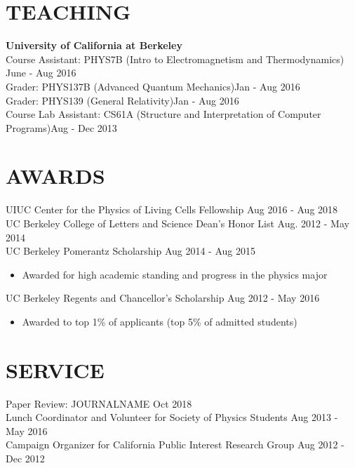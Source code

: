 \documentclass{res}
\newcommand{\rfill}{\hspace*{\fill}}
\begin{document}
\begin{resume}
\section{TEACHING}
   \textbf{University of California at Berkeley}
   \\Course Assistant: PHYS7B (Intro to Electromagnetism and Thermodynamics) \hfill June - Aug 2016
   \\Grader: PHYS137B (Advanced Quantum Mechanics)\hfill Jan - Aug 2016
   \\Grader: PHYS139 (General Relativity)\hfill Jan - Aug 2016
   \\Course Lab Assistant: CS61A (Structure and Interpretation of Computer Programs)\hfill Aug - Dec 2013
\section{AWARDS}
   UIUC Center for the Physics of Living Cells Fellowship \hfill Aug 2016 - Aug 2018\\
   UC Berkeley College of Letters and Science Dean's Honor List \hfill Aug. 2012 - May 2014\\
   UC Berkeley Pomerantz Scholarship \hfill Aug 2014 - Aug 2015\\
   \begin{itemize}
   \item {\normalfont Awarded for high academic standing and progress in the physics major}
   \end{itemize}

   UC Berkeley Regents and Chancellor's Scholarship \hfill Aug 2012 - May 2016\\
   \begin{itemize}
   \item {\normalfont Awarded to top 1\% of applicants (top 5\% of admitted students)}
   \end{itemize}
\vspace{-10pt}
\section{SERVICE}
Paper Review: JOURNALNAME \rfill Oct 2018\\
Lunch Coordinator and Volunteer for Society of Physics Students \rfill Aug 2013 - May 2016 \\
Campaign Organizer for California Public Interest Research Group \rfill Aug 2012 - Dec 2012 \\
\end{resume}
\end{document}
